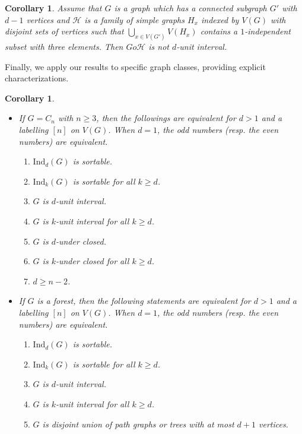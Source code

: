 \documentclass[12pt,reqno]{amsart}
\theoremstyle{plain}
\newtheorem{corollary}[theorem]{Corollary}
\theoremstyle{definition}
\numberwithin{equation}{section}
\begin{document}
\begin{corollary}
Assume that $G$ is a graph which has a connected subgraph $G'$ with $d-1$ vertices and $\mathcal{H}$ is a family of simple graphs $H_x$ indexed by $V(G)$ with disjoint sets of vertices such that $\bigcup_{x\in V(G')} V(H_x)$ contains a $1$-independent subset with three elements. Then $Go\mathcal{H}$ is not $d$-unit interval.
\end{corollary}

Finally, we apply our results to specific graph classes, providing explicit characterizations.

\begin{corollary}\label{2.4}
\begin{itemize}
\item[a.] If $G=C_n$ with $n\geq 3$, then the followings are equivalent for $d>1$ and a labelling $[n]$ on $V(G)$. When $d=1$, the odd numbers (resp. the even numbers) are equivalent.
\begin{enumerate}
\item $\mathrm{Ind}_d(G)$ is sortable.
\item $\mathrm{Ind}_k(G)$ is sortable for all $k\geq d$.
\item $G$ is $d$-unit interval.
\item $G$ is $k$-unit interval for all $k\geq d$.
\item$G$ is $d$-under closed.
\item $G$ is $k$-under closed for all $k\geq d$.
\item $d\geq n-2$.
\end{enumerate}

\item[b.] If $G$ is a forest, then the following statements are equivalent for $d>1$ and a labelling $[n]$ on $V(G)$. When $d=1$, the odd numbers (resp. the even numbers) are equivalent.
\begin{enumerate}
\item $\mathrm{Ind}_d(G)$ is sortable.
\item $\mathrm{Ind}_k(G)$ is sortable for all $k\geq d$.
\item $G$ is $d$-unit interval.
\item $G$ is $k$-unit interval for all $k\geq d$.
\item $G$ is disjoint union of path graphs or trees with at most $d+1$ vertices.
\end{enumerate}
\end{itemize}

\end{corollary}
\end{document}
